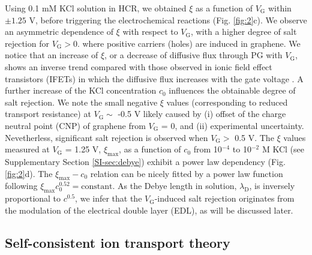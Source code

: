 \documentclass[journal=nalefd,email=true, hyperref=true, keywords=false]{achemso}
\newcommand{\Fig}{Fig.}
\begin{document}
Using 0.1 mM KCl solution in HCR, we obtained $\xi$ as a function of
$V_{\mathrm{G}}$ within $\pm1.25$ V, before triggering the
electrochemical reactions (\Fig{} \ref{fig:2}c). We observe an
asymmetric dependence of $\xi$ with respect to $V_{\mathrm{G}}$, with
a higher degree of salt rejection for $V_{\mathrm{G}}>0$. where
positive carriers (holes) are induced in graphene. We notice that an
increase of $\xi$, or a decrease of diffusive flux through PG with
$V_{\mathrm{G}}$, shows an inverse trend compared with those
observed in ionic field effect transistors (IFETs) in which the
diffusive flux increases with the gate voltage
\cite{Nam_2009,Cheng_2018}. A further increase of the KCl
concentration $c_{0}$ influences the obtainable degree of salt
rejection. 
{
We note the small negative $\xi$ values (corresponding to reduced transport resistance) at $V_{\mathrm{G}} \sim{}$ -0.5 V
likely caused by (i) offset of the charge neutral point (CNP) of graphene from $V_{\mathrm{G}}$ = 0, and (ii) experimental uncertainty.
Nevetherless, significant salt rejection is observed when $V_{\mathrm{G}}>$ 0.5 V.
}
The $\xi$ values measured at $V_{\mathrm{G}}$ = 1.25 V,
$\xi_{\mathrm{max}}$, as a function of $c_{0}$ from 10$^{-4}$ to
10$^{-2}$ M KCl (see Supplementary Section \ref{SI-sec:debye}) exhibit
a power law dependency (\Fig{} \ref{fig:2}d). The
$\xi_{\mathrm{max}}-c_{0}$ relation can be nicely fitted by a power
law function following
$\xi_{\mathrm{max}} c_{0}^{0.52} = \mathrm{constant}$. As the Debye
length in solution, $\lambda_{\mathrm{D}}$, is inversely proportional
to $c^{0.5}$, we infer that the $V_{\mathrm{G}}$-induced salt
rejection originates from the modulation of the electrical double
layer (EDL), as will be discussed later.

\subsection{Self-consistent ion transport theory}
\label{sec:theory}
\end{document}
